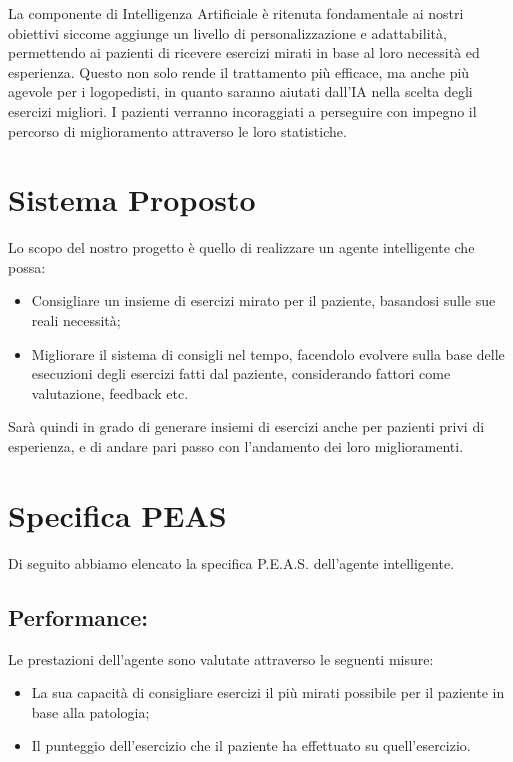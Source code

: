 \documentclass{article}
\begin{document}
    La componente di Intelligenza Artificiale è ritenuta fondamentale ai nostri obiettivi siccome aggiunge un livello di personalizzazione e adattabilità, permettendo ai pazienti di ricevere esercizi mirati in base al loro necessità ed esperienza. Questo non solo rende il trattamento più efficace, ma anche più agevole per i logopedisti, in quanto saranno aiutati dall'IA nella scelta degli esercizi migliori. I pazienti verranno incoraggiati a perseguire con impegno il percorso di miglioramento attraverso le loro statistiche.

    \section{Sistema Proposto}

    Lo scopo del nostro progetto è quello di realizzare un agente intelligente che possa:

    \begin{itemize}
        \item Consigliare un insieme di esercizi mirato per il paziente, basandosi sulle sue reali necessità;
        \item Migliorare il sistema di consigli nel tempo, facendolo evolvere sulla base delle esecuzioni degli esercizi fatti dal paziente, considerando fattori come valutazione, feedback etc.
    \end{itemize}

    Sarà quindi in grado di generare insiemi di esercizi anche per pazienti privi di esperienza, e di andare pari passo con l'andamento dei loro miglioramenti.

    \pagebreak

    \section{Specifica PEAS}

    Di seguito abbiamo elencato la specifica P.E.A.S. dell'agente intelligente.

    \subsection{Performance:}

    Le prestazioni dell’agente sono valutate attraverso le seguenti misure:

    \begin{itemize}
        \item La sua capacità di consigliare esercizi il più mirati possibile per il paziente in base alla patologia;
        \item Il punteggio dell'esercizio che il paziente ha effettuato su quell'esercizio.
    \end{itemize}
\end{document}
